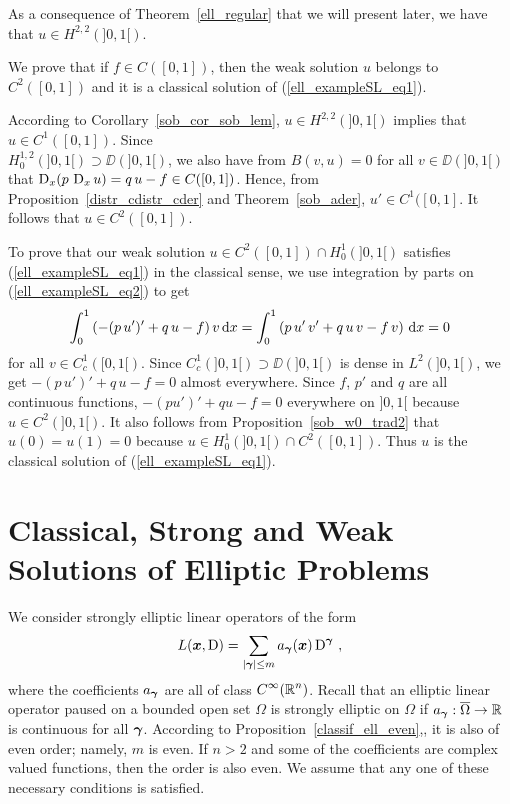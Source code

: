 \begin{egg}
As a consequence of Theorem~\ref{ell_regular} that we will present later,
we have that $\displaystyle u\in H^{2,2}(]0,1[)$.

We prove that if $f \in C([0,1])$, then
the weak solution $u$ belongs to $\displaystyle C^2([0,1])$ and it is
a classical solution of (\ref{ell_exampleSL_eq1}).

According to Corollary~\ref{sob_cor_sob_lem},
$\displaystyle u\in H^{2,2}(]0,1[)$
implies that $\displaystyle u \in C^1([0,1])$.  Since\\
$\displaystyle H^{1,2}_0(]0,1[) \supset \DD(]0,1[)$,
we also have from $B(v,u)=0$ for all $v \in \DD(]0,1[)$ that
$\operatorname{D}_x(p\, \operatorname{D}_x u) = q\,u - f \in C([0,1])$.  Hence, from
Proposition~\ref{distr_cdistr_cder} and Theorem~\ref{sob_ader},
$u'\in C^1([0,1]$.  It follows that $\displaystyle u \in C^2([0,1])$.

To prove that our weak solution
$\displaystyle u \in C^2([0,1]) \cap H^1_0(]0,1[)$
satisfies (\ref{ell_exampleSL_eq1}) in the classical sense, we use
integration by parts on (\ref{ell_exampleSL_eq2}) to get
\[
\int_0^1 \left( -(p\,u')' + q\,u - f\right) v \,\mathrm{d}{x} =
\int_0^1 \left( p\,u'\, v' + q\,u\,v - f\, v\right) \,\mathrm{d}{x} = 0
\]
for all $\displaystyle v \in C^1_c([0,1[)$.
Since $\displaystyle C^1_c(]0,1[)\supset \DD(]0,1[)$ is dense in
$\displaystyle L^2(]0,1[)$, we
get $\displaystyle -(p\,u')' + q\,u - f = 0$ almost
everywhere.  Since $f$, $p'$ and $q$ are all continuous functions,
$\displaystyle -(pu')' + q u -f = 0$ everywhere on $]0,1[$ because
$\displaystyle u\in C^2(]0,1[)$.  It also follows from
Proposition~\ref{sob_w0_trad2} that $u(0)=u(1)=0$ because
$\displaystyle u \in H^1_0(]0,1[)\cap C^2([0,1])$.  Thus $u$ is the classical
solution of (\ref{ell_exampleSL_eq1}). 
\end{egg}

\section[Classical, Strong and Weak Solutions]{Classical, Strong and
Weak Solutions of Elliptic Problems} \label{CSWSsection}

We consider strongly elliptic linear operators of the form
\begin{equation} \label{ell_op1} 
L({\bm{x}}, \operatorname{D}) = \sum_{|{\bm{\gamma}}|\leq m} a_{{\bm{\gamma}}}({\bm{x}})
\operatorname{D}^{{\bm{\gamma}}} \ ,
\end{equation}
where the coefficients $a_{{\bm{\gamma}}}$ are all of class
$\displaystyle C^\infty(\mathbb{R}^n)$.
Recall that an elliptic linear operator paused
on a bounded open set $\Omega$ is strongly elliptic on $\Omega$ if
$a_{{\bm{\gamma}}}:\overline{\Omega} \to \mathbb{R}$ is continuous for all
${\bm{\gamma}}$.
According to Proposition~\ref{classif_ell_even},, it is also of even
order; namely, $m$ is even.  If $n>2$ and some of the coefficients are
complex valued functions, then the order is also even.
We assume that any one of these necessary conditions is satisfied.

